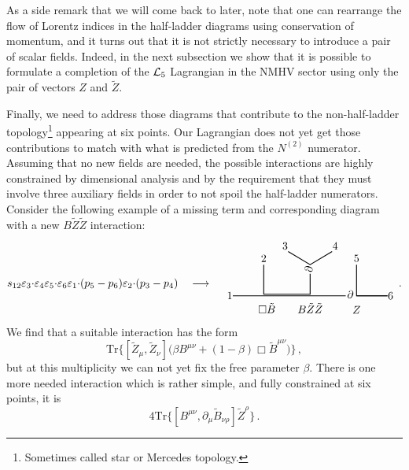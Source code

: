 \documentclass[11pt,a4paper]{article}
\newcommand{\ee}[2]{\varepsilon_{#1} {\cdot} \varepsilon_{#2}}
\begin{document}
As a side remark that we will come back to later, note that one can rearrange the flow of Lorentz indices in the half-ladder diagrams using conservation of momentum, and it turns out that it is not strictly necessary to introduce a pair of scalar fields. Indeed, in the next subsection we show that it is possible to formulate a completion of the ${\cal L}_5$ Lagrangian in the NMHV sector using only the pair of vectors $Z$ and $\tilde{Z}$.

Finally, we need to address those diagrams that contribute to the non-half-ladder topology\footnote{Sometimes called star or Mercedes topology.} appearing at six points. Our Lagrangian does not yet get those contributions to match with what is predicted from the $N^{(2)}$ numerator. Assuming that no new fields are needed, the possible interactions are highly constrained by dimensional analysis and by the requirement that they must involve three auxiliary fields in order to not spoil the half-ladder numerators. Consider the following example of a missing term and corresponding diagram with a new $B\tilde{Z}\tilde{Z}$ interaction:
\begin{equation}
s_{12} \ee{3}{4} \ee{5}{6} \varepsilon_1 {\cdot} (p_5-p_6) \varepsilon_2 {\cdot} (p_3-p_4)
 \ \ \ \longrightarrow \ \ \ 
\label{eq:diagnh1}
\begin{tikzpicture}[baseline={(0, +0.3cm)}]
\draw[thick] (-2.5,0) -- (1.15,0);
\draw[thick] (1.5,0) -- (2.5,0);
\draw[thick] (-1.5,1) -- (-1.5,0.05)--(0,0.05)--(0,0.71);
\draw[thick] (1.5,1) -- (1.5,0) -- (2.5,0);
\draw[thick] (0.71,1.42) -- (0,1) -- (-0.71,1.42);
\node at (-2.6,0) {$1$};
\node at (-1.5,1.2) {$2$};
\node at (-.81,1.6) {$3$};
\node at (.81,1.6) {$4$};
\node at (1.5,1.2) {$5$};
\node at (2.6,0) {$6$};
\node at (-1.4,-0.4) {$\Box \tilde{B}$};
\node at (0,-0.4) {$B \tilde{Z}\tilde{Z}$};
\node at (1.5,-0.45) {$Z$};
\node at (-0.05,0.85) {\rotatebox[origin=c]{90}{$\partial$}};
\node at (1.3,0.05) {$\partial$};
\end{tikzpicture} \, . 
\end{equation}
We find that a suitable interaction has the form
\begin{equation}
  \text{Tr} \Big\{   [\tilde{Z}_{\mu} ,\tilde{Z}_{\nu}] \big( \beta  B^{\mu \nu}
+ (1-\beta)  \Box \tilde{B}^{\mu \nu} \big) \Big\}\,,
\end{equation}
but at this multiplicity we can not yet fix the free parameter $\beta$. There is one more needed interaction which is rather simple, and fully constrained at six points, it is
\begin{equation}
 4  \text{Tr}   \Big\{ [B^{\mu \nu} ,\partial_\mu\tilde{B}_{\nu\rho} ] \tilde{Z}^{\rho} \Big\}\,. 
\end{equation}
\end{document}
